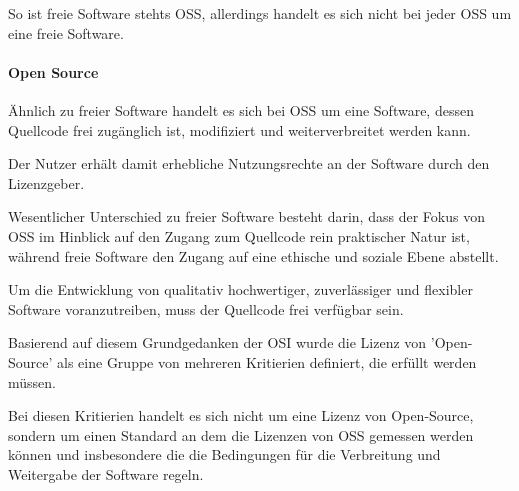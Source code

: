 So ist freie Software stehts OSS, allerdings handelt es sich nicht bei jeder OSS um eine freie Software. 

\paragraph{Open Source}
Ähnlich zu freier Software handelt es sich bei OSS um eine Software, dessen Quellcode frei zugänglich ist, modifiziert und weiterverbreitet werden kann. 

Der Nutzer erhält damit erhebliche Nutzungsrechte an der Software durch den Lizenzgeber. 

Wesentlicher Unterschied zu freier Software besteht darin, dass der Fokus von OSS im Hinblick auf den Zugang zum Quellcode rein praktischer Natur ist, während freie Software den Zugang auf eine ethische und soziale Ebene abstellt. \cite[S. 28]{kees_open_2015}

Um die Entwicklung von qualitativ hochwertiger, zuverlässiger und flexibler Software voranzutreiben, muss der Quellcode frei verfügbar sein. 

Basierend auf diesem Grundgedanken der OSI wurde die Lizenz von 'Open-Source' als eine Gruppe von mehreren Kritierien definiert, die erfüllt werden müssen.  

Bei diesen Kritierien handelt es sich nicht um eine Lizenz von Open-Source, sondern um einen Standard an dem die Lizenzen von OSS gemessen werden können und insbesondere die die Bedingungen für die Verbreitung und Weitergabe der Software regeln. 


